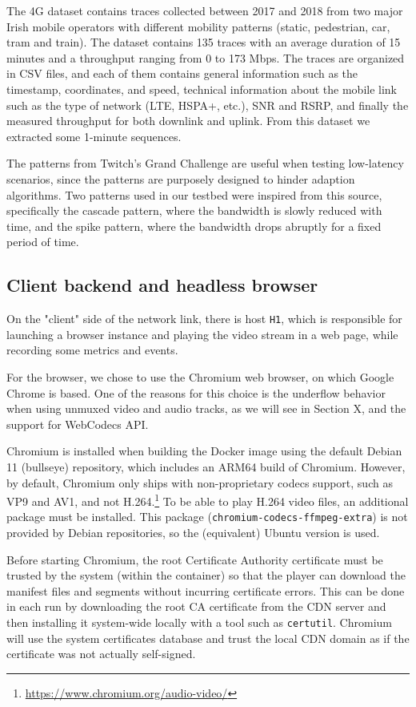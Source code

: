The 4G dataset contains traces collected between 2017 and 2018 from two major Irish mobile operators with different mobility patterns (static, pedestrian, car, tram and train). The dataset contains 135 traces with an average duration of 15 minutes and a throughput ranging from 0 to 173 Mbps. The traces are organized in CSV files, and each of them contains general information such as the timestamp, coordinates, and speed, technical information about the mobile link such as the type of network (LTE, HSPA+, etc.), SNR and RSRP, and finally the measured throughput for both downlink and uplink. From this dataset we extracted some 1-minute sequences. %

The patterns from Twitch's Grand Challenge are useful when testing low-latency scenarios, since the patterns are purposely designed to hinder adaption algorithms. Two patterns used in our testbed were inspired from this source, specifically the cascade pattern, where the bandwidth is slowly reduced with time, and the spike pattern, where the bandwidth drops abruptly for a fixed period of time.

\subsection{Client backend and headless browser}
\label{sec:eval/testbed/backend}

On the "client" side of the network link, there is host \texttt{H1}, which is responsible for launching a browser instance and playing the video stream in a web page, while recording some metrics and events.

For the browser, we chose to use the Chromium web browser, on which Google Chrome is based. One of the reasons for this choice is the underflow behavior when using unmuxed video and audio tracks, as we will see in Section X, and the support for WebCodecs API.

Chromium is installed when building the Docker image using the default Debian 11 (bullseye) repository, which includes an ARM64 build of Chromium. However, by default, Chromium only ships with non-proprietary codecs support, such as VP9 and AV1, and not H.264.\footnote{\url{https://www.chromium.org/audio-video/}} To be able to play H.264 video files, an additional package must be installed. This package (\texttt{chromium-codecs-ffmpeg-extra}) is not provided by Debian repositories, so the (equivalent) Ubuntu version is used.

Before starting Chromium, the root Certificate Authority certificate must be trusted by the system (within the container) so that the player can download the manifest files and segments without incurring certificate errors. This can be done in each run by downloading the root CA certificate from the CDN server and then installing it system-wide locally with a tool such as \texttt{certutil}. Chromium will use the system certificates database and trust the local CDN domain as if the certificate was not actually self-signed.


